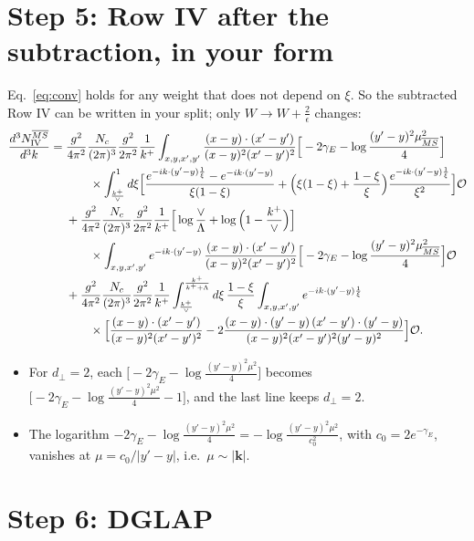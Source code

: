 \documentclass[10pt]{article}
\numberwithin{equation}{section}
\newcommand{\OO}{\mathcal O}
\newcommand{\pre}{\frac{g^{2}}{4\pi^{2}}\frac{N_{c}}{(2\pi)^{3}}\frac{g^{2}}{2\pi^{2}}\frac{1}{k^{+}}}
\newcommand{\XX}{\frac{(x-y)\cdot(x'-y')}{(x-y)^{2}(x'-y')^{2}}}
\newcommand{\ph}{e^{-ik\cdot(y'-y)\frac{1}{\xi}}}
\newcommand{\phone}{e^{-ik\cdot(y'-y)}}
\begin{document}
\section{Step 5: Row IV after the subtraction, in your form}\label{sec:fin}
Eq.~\eqref{eq:conv} holds for any weight that does not depend on $\xi$. So the subtracted Row IV can be written in your split; only $W\to W+\frac{2}{\epsilon}$ changes:
\begin{align}
\frac{d^{3}N^{\overline{MS}}_{\rm IV}}{d^{3}k}={}&\pre\int_{x,y,x',y'}\XX\Big[-2\gamma_E-\log\frac{(y'-y)^2\mu^2_{\overline{MS}}}{4}\Big]\notag\\
&\qquad\times\int_{\frac{k^{+}}{\vee}}^{1}d\xi\Big[\frac{\ph-\phone}{\xi(1-\xi)}+\Big(\xi(1-\xi)+\frac{1-\xi}{\xi}\Big)\frac{\ph}{\xi^2}\Big]\OO\notag\\
&+\pre\Big[\log\frac{\vee}{\Lambda}+\log\Big(1-\frac{k^{+}}{\vee}\Big)\Big]\notag\\
&\qquad\times\int_{x,y,x',y'}\phone\,\XX\Big[-2\gamma_E-\log\frac{(y'-y)^2\mu^2_{\overline{MS}}}{4}\Big]\OO\notag\\
&+\pre\int_{\frac{k^{+}}{\vee}}^{\frac{k^{+}}{k^{+}+\Lambda}}d\xi\,\frac{1-\xi}{\xi}\int_{x,y,x',y'}\ph\notag\\
&\qquad\times\Big[\XX-2\frac{(x-y)\cdot(y'-y)\,(x'-y')\cdot(y'-y)}{(x-y)^{2}(x'-y')^{2}(y'-y)^{2}}\Big]\OO .
\label{eq:fin}
\end{align}
\begin{itemize}
\item For $d_\perp=2$, each $\big[-2\gamma_E-\log\frac{(y'-y)^2\mu^2}{4}\big]$ becomes $\big[-2\gamma_E-\log\frac{(y'-y)^2\mu^2}{4}-1\big]$, and the last line keeps $d_\perp=2$.
\item The logarithm $-2\gamma_E-\log\frac{(y'-y)^2\mu^2}{4}=-\log\frac{(y'-y)^2\mu^2}{c_0^2}$, with $c_0=2e^{-\gamma_E}$, vanishes at $\mu=c_0/|y'-y|$, i.e.\ $\mu\sim|\mathbf k|$.
\end{itemize}

\section{Step 6: DGLAP}\label{sec:dglap}
\end{document}
